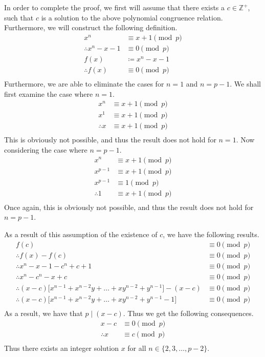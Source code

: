 In order to complete the proof, we first will assume that there exists a $\displaystyle{c \in \mathbb{Z}^{+}}$, such that $\displaystyle{c}$ is a solution to the above polynomial congruence relation. Furthermore, we will construct the following definition.
		\begin{align*}
		x^n & \equiv x+1 \pmod{p}\\
		\therefore x^n - x - 1 & \equiv 0 \pmod{p}\\
		f(x) & \coloneqq x^n - x -1 \\
		\therefore f(x) & \equiv 0 \pmod{p}\\
		\end{align*}
		Furthermore, we are able to eliminate the cases for $\displaystyle{n = 1}$ and $\displaystyle{n = p-1}$. We shall first examine the case where $\displaystyle{n=1}$.
		\begin{align*}
		x^{n} & \equiv x + 1 \pmod{p}\\
		x^{1} & \equiv x + 1 \pmod{p}\\
		\therefore x & \equiv x + 1 \pmod{p}\\
		\end{align*}
		This is obviously not possible, and thus the result does not hold for $\displaystyle{n=1}$. Now considering the case where $\displaystyle{n = p-1}$.
		\begin{align*}
		x^{n} & \equiv x + 1 \pmod{p}\\
		x^{p-1} & \equiv x + 1 \pmod{p}\\
		x^{p-1} & \equiv 1 \pmod{p}\\
		\therefore 1 & \equiv x + 1 \pmod{p}\\
		\end{align*}
		Once again, this is obviously not possible, and thus the result does not hold for $\displaystyle{n = p-1}$.

		\bigbreak

		As a result of this assumption of the existence of $\displaystyle{c}$, we have the following results.
		\begin{align*}
		f(c) & \equiv 0 \pmod{p}\\
		\therefore f(x) - f(c) & \equiv 0 \pmod{p}\\
		\therefore x^n - x - 1 - c^n + c + 1 & \equiv 0 \pmod{p}\\
		\therefore x^n - c^n - x + c & \equiv 0 \pmod{p}\\
		\therefore (x-c)\big[x^{n-1} + x^{n-2}y + \dots + xy^{n-2} + y^{n-1} \big] - (x-c) & \equiv 0 \pmod{p}\\
		\therefore (x-c)\big[x^{n-1} + x^{n-2}y + \dots + xy^{n-2} + y^{n-1} - 1 \big] & \equiv 0 \pmod{p}\\
		\end{align*}
		As a result, we have that $\displaystyle{p \mid (x-c)}$. Thus we get the following consequences.
		\begin{align*}
		x-c & \equiv 0 \pmod{p}\\
		\therefore x & \equiv c \pmod{p}\\
		\end{align*}
		Thus there exists an integer solution $\displaystyle{x}$ for all $\displaystyle{n \in \{2,3,\dots,p-2 \}}$.

